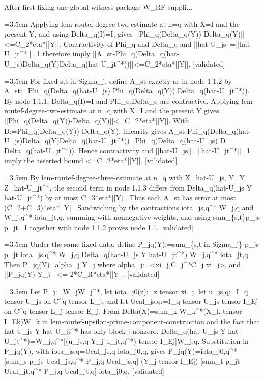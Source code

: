 \documentclass{article}
\newcommand{\step}[1]{\par\noindent\hangindent=3.5em\hangafter=1%
  \makebox[3.5em][l]{\textbf{#1.}}}
\newcommand{\steptag}[1]{\hfill{\small\textsf{[#1]}}}
\begin{document}
\begin{proofbox}{After first fixing one global witness package W\_RF suppli...}
\step{1.1.3} Applying lem-routef-degree-two-estimate at n=q with X=I and the present Y, and using Delta\_q(I)=I, gives ||Phi\_q(Delta\_q(Y))-Delta\_q(Y)||<=C\_2*eta*||Y||. Contractivity of Phi\_q and Delta\_q and ||hat-U\_js||=||hat-U\_jt\textasciicircum{}*||=1 therefore imply ||A\_st-Phi\_q(Delta\_q(hat-U\_js)Delta\_q(Y)Delta\_q(hat-U\_jt\textasciicircum{}*))||<=C\_2*eta*||Y||. \steptag{validated} \\[6pt]
\step{1.1.3.1} For fixed s,t in Sigma\_j, define A\_st exactly as in node 1.1.2 by A\_st:=Phi\_q(Delta\_q(hat-U\_js) Phi\_q(Delta\_q(Y)) Delta\_q(hat-U\_jt\textasciicircum{}*)). By node 1.1.1, Delta\_q(I)=I and Phi\_q,Delta\_q are contractive. Applying lem-routef-degree-two-estimate at n=q with X=I and the present Y gives ||Phi\_q(Delta\_q(Y))-Delta\_q(Y)||<=C\_2*eta*||Y||. With D:=Phi\_q(Delta\_q(Y))-Delta\_q(Y), linearity gives A\_st-Phi\_q(Delta\_q(hat-U\_js)Delta\_q(Y)Delta\_q(hat-U\_jt\textasciicircum{}*))=Phi\_q(Delta\_q(hat-U\_js) D Delta\_q(hat-U\_jt\textasciicircum{}*)). Hence contractivity and ||hat-U\_js||=||hat-U\_jt\textasciicircum{}*||=1 imply the asserted bound <=C\_2*eta*||Y||. \steptag{validated} \\[4pt]
\step{1.1.4} By lem-routef-degree-three-estimate at n=q with X=hat-U\_js, Y=Y, Z=hat-U\_jt\textasciicircum{}*, the second term in node 1.1.3 differs from Delta\_q(hat-U\_js Y hat-U\_jt\textasciicircum{}*) by at most C\_3*eta*||Y||. Thus each A\_st has error at most (C\_2+C\_3)*eta*||Y||. Sandwiching by the contractions iota\_js,q\textasciicircum{}* W\_j,q and W\_j,q\textasciicircum{}* iota\_jt,q, summing with nonnegative weights, and using sum\_\{s,t\}p\_js p\_jt=1 together with node 1.1.2 proves node 1.1. \steptag{validated} \\[4pt]
\step{1.2} Under the same fixed data, define P\_jq(Y):=sum\_\{s,t in Sigma\_j\} p\_js p\_jt iota\_js,q\textasciicircum{}* W\_j,q Delta\_q(hat-U\_js Y hat-U\_jt\textasciicircum{}*) W\_j,q\textasciicircum{}* iota\_jt,q. Then P\_jq(Y)=alpha\_j Y\_j where alpha\_j:=<xi\_j,C\_j\textasciicircum{}*C\_j xi\_j>, and ||P\_jq(Y)-Y\_j|| <= 2*C\_R*eta*||Y||. \steptag{validated} \\[6pt]
\step{1.2.1} Let P\_j:=W\_jW\_j\textasciicircum{}*, let iota\_j0(z):=z tensor xi\_j, let u\_js,q:=I\_q tensor U\_js on C\textasciicircum{}q tensor L\_j, and let Ucal\_js,q:=I\_q tensor U\_js tensor I\_Ej on C\textasciicircum{}q tensor L\_j tensor E\_j. From Delta(X)=sum\_k W\_k\textasciicircum{}*(X\_k tensor I\_Ek)W\_k in lem-routef-upsilon-prime-component-construction and the fact that hat-U\_js Y hat-U\_jt\textasciicircum{}* has only block j nonzero, Delta\_q(hat-U\_js Y hat-U\_jt\textasciicircum{}*)=W\_j,q\textasciicircum{}*[(u\_js,q Y\_j u\_jt,q\textasciicircum{}*) tensor I\_Ej]W\_j,q. Substitution in P\_jq(Y), with iota\_js,q=Ucal\_js,q iota\_j0,q, gives P\_jq(Y)=iota\_j0,q\textasciicircum{}* [sum\_s p\_js Ucal\_js,q\textasciicircum{}* P\_j,q Ucal\_js,q] (Y\_j tensor I\_Ej) [sum\_t p\_jt Ucal\_jt,q\textasciicircum{}* P\_j,q Ucal\_jt,q] iota\_j0,q. \steptag{validated} \\[4pt]

\end{proofbox}
\end{document}
